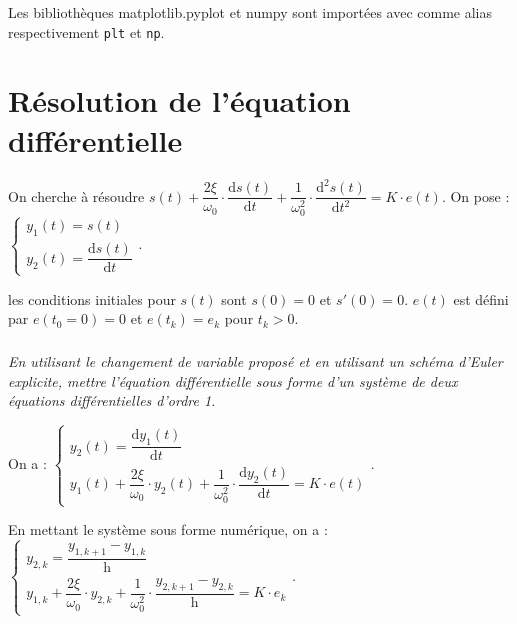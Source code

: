 \documentclass[10pt,fleqn]{article} %
\begin{document}
Les bibliothèques matplotlib.pyplot et numpy sont importées avec comme alias respectivement \texttt{plt} et \texttt{np}.
\fi
\section{Résolution de l'équation différentielle}

\ifprof
\else

On cherche à résoudre $
s(t)
+\dfrac{2\xi}{\omega_0}\cdot \dfrac{\text{d}s(t)}{\text{d}t}
+\dfrac{1}{\omega_0^2}\cdot \dfrac{\text{d}^2s(t)}{\text{d}t^2}
= K\cdot e(t)
$.
On pose : 
$
\left\{ 
\begin{array}{l}
y_1(t)=s(t) \\
y_2(t)=\dfrac{\text{d}s(t)}{\text{d} t}
\end{array}
\right.
$.

les conditions initiales pour $s(t)$ sont $s(0)=0$ et $s'(0)=0$. $e(t)$ est défini par $e(t_0=0)=0$ et $e(t_k)=e_k$ pour $t_k>0$.
\fi

\subparagraph{}
\textit{En utilisant le changement de variable proposé et en utilisant un schéma d'Euler explicite, mettre l'équation différentielle sous forme d'un système de deux équations différentielles d'ordre 1.}

\ifprof
\begin{corrige}
%

On a : 
$
\left\{ 
\begin{array}{l}
y_2(t)=\dfrac{\text{d}y_1(t)}{\text{d} t} \\
y_1(t)
+\dfrac{2\xi}{\omega_0}\cdot y_2(t)
+\dfrac{1}{\omega_0^2}\cdot \dfrac{\text{d}y_2(t)}{\text{d}t}
= K\cdot e(t)
\end{array}
\right.
$.

En mettant le système sous forme numérique, on a : 
$\left\{ 
\begin{array}{l}
y_{2,k}=\dfrac{y_{1,k+1}-y_{1,k}}{\text{h}} \\
y_{1,k}
+\dfrac{2\xi}{\omega_0}\cdot y_{2,k}
+\dfrac{1}{\omega_0^2}\cdot \dfrac{y_{2,k+1}-y_{2,k}}{\text{h}}
= K\cdot e_k
\end{array}
\right.$.

\end{corrige}
\else
\fi
\end{document}
